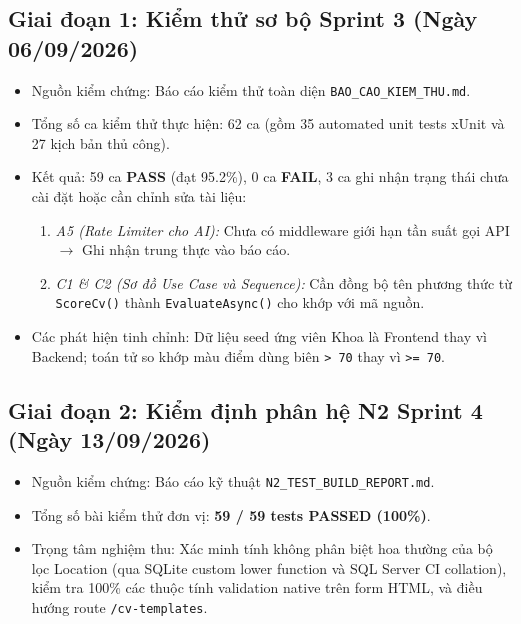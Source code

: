 \subsection{Giai đoạn 1: Kiểm thử sơ bộ Sprint 3 (Ngày 06/09/2026)}
\begin{itemize}
    \item Nguồn kiểm chứng: Báo cáo kiểm thử toàn diện \texttt{BAO\_CAO\_KIEM\_THU.md}.
    \item Tổng số ca kiểm thử thực hiện: 62 ca (gồm 35 automated unit tests xUnit và 27 kịch bản thủ công).
    \item Kết quả: 59 ca \textbf{PASS} (đạt 95.2\%), 0 ca \textbf{FAIL}, 3 ca ghi nhận trạng thái chưa cài đặt hoặc cần chỉnh sửa tài liệu:
    \begin{enumerate}
        \item \textit{A5 (Rate Limiter cho AI):} Chưa có middleware giới hạn tần suất gọi API $\rightarrow$ Ghi nhận trung thực vào báo cáo.
        \item \textit{C1 \& C2 (Sơ đồ Use Case và Sequence):} Cần đồng bộ tên phương thức từ \texttt{ScoreCv()} thành \texttt{EvaluateAsync()} cho khớp với mã nguồn.
    \end{enumerate}
    \item Các phát hiện tinh chỉnh: Dữ liệu seed ứng viên Khoa là Frontend thay vì Backend; toán tử so khớp màu điểm dùng biên \texttt{> 70} thay vì \texttt{>= 70}.
\end{itemize}

\subsection{Giai đoạn 2: Kiểm định phân hệ N2 Sprint 4 (Ngày 13/09/2026)}
\begin{itemize}
    \item Nguồn kiểm chứng: Báo cáo kỹ thuật \texttt{N2\_TEST\_BUILD\_REPORT.md}.
    \item Tổng số bài kiểm thử đơn vị: \textbf{59 / 59 tests PASSED (100\%)}.
    \item Trọng tâm nghiệm thu: Xác minh tính không phân biệt hoa thường của bộ lọc Location (qua SQLite custom lower function và SQL Server CI collation), kiểm tra 100\% các thuộc tính validation native trên form HTML, và điều hướng route \texttt{/cv-templates}.
\end{itemize}

